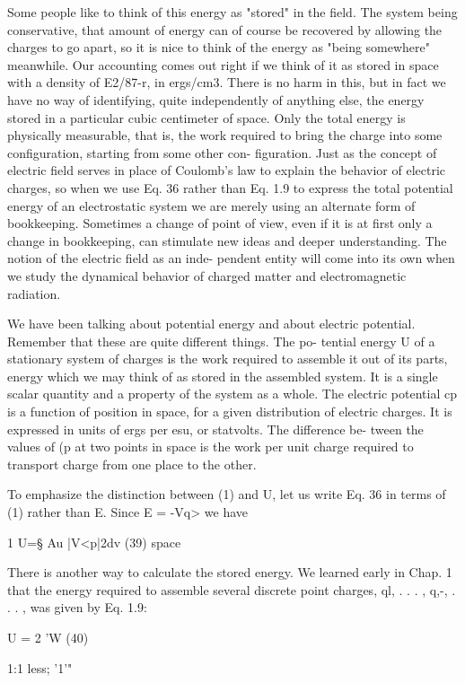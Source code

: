 Some people like to think of this energy as "stored" in the field.
The system being conservative, that amount of energy can of course
be recovered by allowing the charges to go apart, so it is nice to think
of the energy as "being somewhere" meanwhile. Our accounting
comes out right if we think of it as stored in space with a density of
E2/87-r, in ergs/cm3. There is no harm in this, but in fact we have no
way of identifying, quite independently of anything else, the energy
stored in a particular cubic centimeter of space. Only the total
energy is physically measurable, that is, the work required to bring
the charge into some configuration, starting from some other con-
figuration. Just as the concept of electric field serves in place of
Coulomb's law to explain the behavior of electric charges, so when
we use Eq. 36 rather than Eq. 1.9 to express the total potential energy
of an electrostatic system we are merely using an alternate form of
bookkeeping. Sometimes a change of point of view, even if it is at
first only a change in bookkeeping, can stimulate new ideas and
deeper understanding. The notion of the electric field as an inde-
pendent entity will come into its own when we study the dynamical
behavior of charged matter and electromagnetic radiation.

We have been talking about potential energy and about electric
potential. Remember that these are quite different things. The po-
tential energy U of a stationary system of charges is the work required
to assemble it out of its parts, energy which we may think of as stored
in the assembled system. It is a single scalar quantity and a property
of the system as a whole. The electric potential cp is a function of
position in space, for a given distribution of electric charges. It is
expressed in units of ergs per esu, or statvolts. The difference be-
tween the values of (p at two points in space is the work per unit
charge required to transport charge from one place to the other.

To emphasize the distinction between (1) and U, let us write Eq. 36
in terms of (1) rather than E. Since E = -Vq> we have

1
U=§ Au |V<p|2dv (39)
space

There is another way to calculate the stored energy. We learned
early in Chap. 1 that the energy required to assemble several discrete
point charges, ql, . . . , q,-, . . . , was given by Eq. 1.9:

U =  2 'W (40)

1:1 less; '1'"

